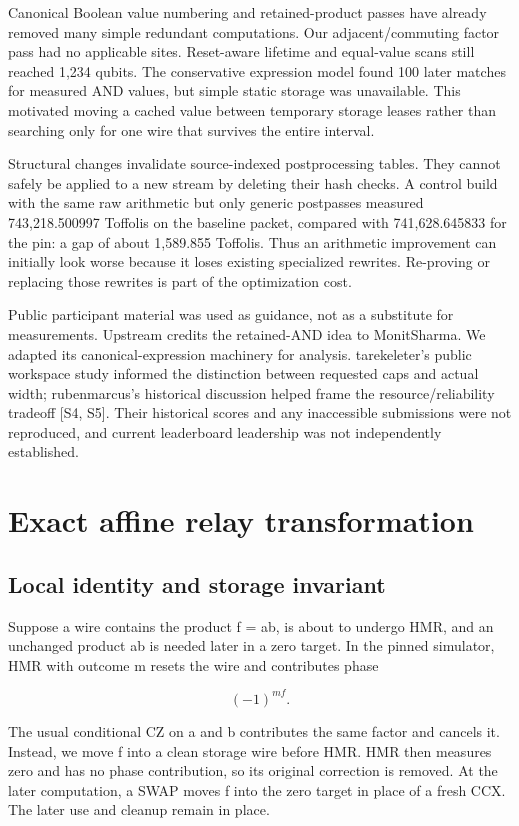 \documentclass[11pt,letterpaper]{article}
\begin{document}
Canonical Boolean value numbering and retained-product passes have already removed many simple redundant computations. Our adjacent/commuting factor pass had no applicable sites. Reset-aware lifetime and equal-value scans still reached 1,234 qubits. The conservative expression model found 100 later matches for measured AND values, but simple static storage was unavailable. This motivated moving a cached value between temporary storage leases rather than searching only for one wire that survives the entire interval.


Structural changes invalidate source-indexed postprocessing tables. They cannot safely be applied to a new stream by deleting their hash checks. A control build with the same raw arithmetic but only generic postpasses measured 743,218.500997 Toffolis on the baseline packet, compared with 741,628.645833 for the pin: a gap of about 1,589.855 Toffolis. Thus an arithmetic improvement can initially look worse because it loses existing specialized rewrites. Re-proving or replacing those rewrites is part of the optimization cost.


Public participant material was used as guidance, not as a substitute for measurements. Upstream credits the retained-AND idea to MonitSharma. We adapted its  canonical-expression machinery for analysis. tarekeleter's public workspace study informed the distinction between requested caps and actual width; rubenmarcus's historical discussion helped frame the resource/reliability tradeoff [S4, S5]. Their historical scores and any inaccessible submissions were not reproduced, and current leaderboard leadership was not independently established.


\section{Exact affine relay transformation}

\subsection{Local identity and storage invariant}

Suppose a wire contains the product f = ab, is about to undergo HMR, and an unchanged product ab is needed later in a zero target. In the pinned simulator, HMR with outcome m resets the wire and contributes phase


\[
(-1)^{mf}.
\]

The usual conditional CZ on a and b contributes the same factor and cancels it. Instead, we move f into a clean storage wire before HMR. HMR then measures zero and has no phase contribution, so its original correction is removed. At the later computation, a SWAP moves f into the zero target in place of a fresh CCX. The later use and cleanup remain in place.
\end{document}
